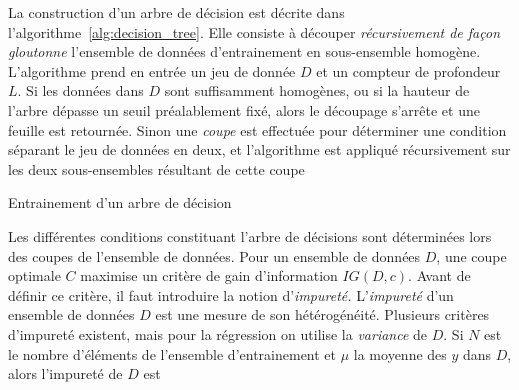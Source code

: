 
La construction d'un arbre de décision est décrite dans l'algorithme~\ref{alg:decision_tree}.
Elle consiste à découper \emph{récursivement de façon gloutonne} l'ensemble de données d'entrainement en sous-ensemble homogène.
L'algorithme prend en entrée un jeu de donnée $D$ et un compteur de profondeur $L$.
Si les données dans $D$ sont suffisamment homogènes, ou si la hauteur de l'arbre dépasse un seuil préalablement fixé, alors le découpage s'arrête et une feuille est retournée.
Sinon une \emph{coupe} est effectuée pour déterminer une condition séparant le jeu de données en deux, et l'algorithme est appliqué récursivement sur les deux sous-ensembles résultant de cette coupe

\begin{algorithm}
\begin{algorithmic}

  \EndIf

  \State{}

  
  \State{}
  

  \State{}
  
  
  \State{}


\EndFunction

\end{algorithmic}
\caption{\label{alg:decision_tree}Entrainement d'un arbre de décision}
\end{algorithm}


Les différentes conditions constituant l'arbre de décisions sont déterminées lors des coupes de l'ensemble de données.
Pour un ensemble de données $D$, une coupe optimale $C$ maximise un critère de gain d'information $IG(D, c)$.
Avant de définir ce critère, il faut introduire la notion d'\emph{impureté.}
L'\emph{impureté} d'un ensemble de données $D$ est une mesure de son hétérogénéité.
Plusieurs critères d'impureté existent, mais pour la régression on utilise la \emph{variance} de $D$.
Si $N$ est le nombre d'éléments de l'ensemble d'entrainement et $\mu$ la moyenne des $y$ dans $D$, alors l'impureté de $D$ est

